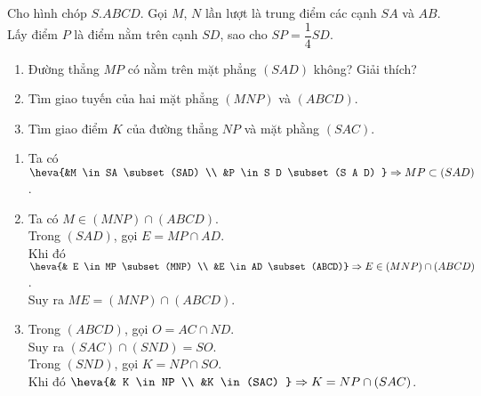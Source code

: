 \begin{bt}%
    Cho hình chóp $S.ABCD$. Gọi $M$, $N$ lần lượt là trung điểm các cạnh $SA$ và $AB$. Lấy điểm $P$ là điểm nằm trên cạnh $SD$, sao cho $SP=\dfrac{1}{4}SD$.
    \begin{enumerate}
        \item Đường thẳng $MP$ có nằm trên mặt phẳng $(SAD)$ không? Giải thích?
        \item Tìm giao tuyến của hai mặt phẳng $(MNP)$ và $(ABCD)$.
        \item Tìm giao điểm $K$ của đường thẳng $NP$ và mặt phằng $(SAC)$.
    \end{enumerate}
    
    \loigiai
    { 
        \immini
        {
            \begin{enumerate}
                \item 
                Ta có $\heva{&M \in SA \subset(SAD)  \\ &P \in S D \subset(S A D) }\Rightarrow MP \subset(SAD)$.
                \item Ta có $M \in(MNP) \cap(ABCD)$.\\
                Trong $(SAD)$, gọi $E=MP \cap AD$.\\
                Khi đó $\heva{& E \in MP \subset(MNP)  \\ &E \in AD \subset(ABCD)}\\ \Rightarrow E \in(MNP) \cap(ABCD)$.\\
                Suy ra $ME=(MNP) \cap(ABCD)$.
                \item Trong $(ABCD)$, gọi $O=AC \cap ND $.\\
                Suy ra $(SAC) \cap(SND)=SO$.\\
                Trong $(SND)$, gọi $K=NP \cap SO$. \\
                Khi đó $\heva{& K \in NP \\ &K \in(SAC) }\Rightarrow K=NP \cap(SAC)$.
            \end{enumerate}
        }
        {
            }}
\end{bt}
